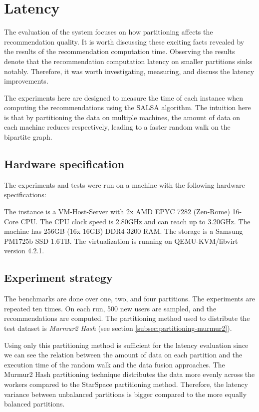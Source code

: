 \section{Latency}
\label{sec:eval-latency}
The evaluation of the system focuses on how partitioning affects the recommendation quality. It is worth discussing these exciting facts revealed by the results of the recommendation computation time. Observing the results denote that the recommendation computation latency on smaller partitions sinks notably. Therefore, it was worth investigating, measuring, and discuss the latency improvements.


The experiments here are designed to measure the time of each instance when computing the recommendations using the SALSA algorithm. The intuition here is that by partitioning the data on multiple machines, the amount of data on each machine reduces respectively, leading to a faster random walk on the bipartite graph. 

\subsection{Hardware specification}
\label{subsec:hardware-spec}
The experiments and tests were run on a machine with the following hardware specifications:

The instance is a VM-Host-Server with 2x AMD EPYC 7282 (Zen-Rome) 16-Core CPU. The CPU clock speed is 2.80GHz and can reach up to 3.20GHz. The machine has 256GB (16x 16GB) DDR4-3200 RAM. The storage is a Samsung PM1725b SSD 1.6TB. The virtualization is running on QEMU-KVM/libvirt version 4.2.1.


\subsection{Experiment strategy}
\label{subsec:latency-experiment-strategy}
The benchmarks are done over one, two, and four partitions. The experiments are repeated ten times. On each run, 500 new users are sampled, and the recommendations are computed. The partitioning method used to distribute the test dataset is \emph{Murmur2 Hash} (see section \ref{subsec:partitioning-murmur2}). 


Using only this partitioning method is sufficient for the latency evaluation since we can see the relation between the amount of data on each partition and the execution time of the random walk and the data fusion approaches. The Murmur2 Hash partitioning technique distributes the data more evenly across the workers compared to the StarSpace partitioning method. Therefore, the latency variance between unbalanced partitions is bigger compared to the more equally balanced partitions.

